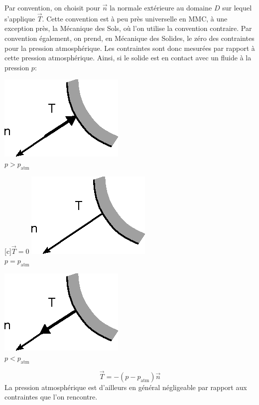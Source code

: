 Par convention, on choisit pour $\vec{n}$ la normale extérieure au domaine $D$ sur lequel s'applique $\vec{T}$. 
Cette convention est à peu près universelle en MMC, à une exception près, la Mécanique des Sols, où l'on utilise la convention contraire.
Par convention également, on prend, en Mécanique des Solides, le zéro des contraintes pour la pression atmosphérique.
Les contraintes sont donc mesurées par rapport à cette pression atmosphérique.
Ainsi, si le solide est en contact avec un fluide à la pression $p$:
\begin{multicols}{3}
    \centering
    \includegraphics{../images/T1_Ch02-0003a}\\
    $p > p_\text{atm}$
    \columnbreak

    [c]{$\vec{T}=0$}
    \includegraphics{../images/T1_Ch02-0003b}\\
    $p = p_\text{atm}$
    \columnbreak

    \includegraphics{../images/T1_Ch02-0003c}\\
    $p < p_\text{atm}$
\end{multicols}
\begin{equation}
    \vec{T} = -\left( p - p_\text{atm} \right) \vec{n}
    \label{eq:Ch02-002}
\end{equation}
La pression atmosphérique est d'ailleurs en général négligeable par rapport aux contraintes que l'on rencontre.


